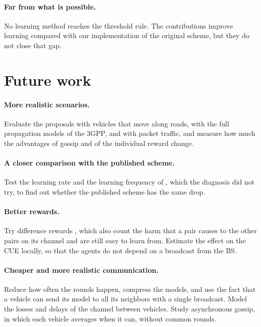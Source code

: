 \paragraph{Far from what is possible.} No learning method reaches the threshold rule. The contributions improve
learning compared with our implementation of the original scheme, but they do not close that gap.

\section{Future work}
\label{sec:conc-future}

\paragraph{More realistic scenarios.} Evaluate the proposals with vehicles that move along roads, with the full
propagation models of the \ac{3GPP}, and with packet traffic, and measure how much the advantages of gossip and
of the individual reward change.

\paragraph{A closer comparison with the published scheme.} Test the learning rate and the learning frequency of
\citet{li+22fedmarl}, which the diagnosis did not try, to find out whether the published scheme has the same drop.

\paragraph{Better rewards.} Try difference rewards \cite{wolpert+01collectives,agogino+08rewards}, which also
count the harm that a pair causes to the other pairs on its channel and are still easy to learn from. Estimate
the effect on the \ac{CUE} locally, so that the agents do not depend on a broadcast from the \ac{BS}.

\paragraph{Cheaper and more realistic communication.} Reduce how often the rounds happen, compress the models,
and use the fact that a vehicle can send its model to all its neighbors with a single broadcast. Model the
losses and delays of the channel between vehicles. Study asynchronous gossip, in which each vehicle averages
when it can, without common rounds.

